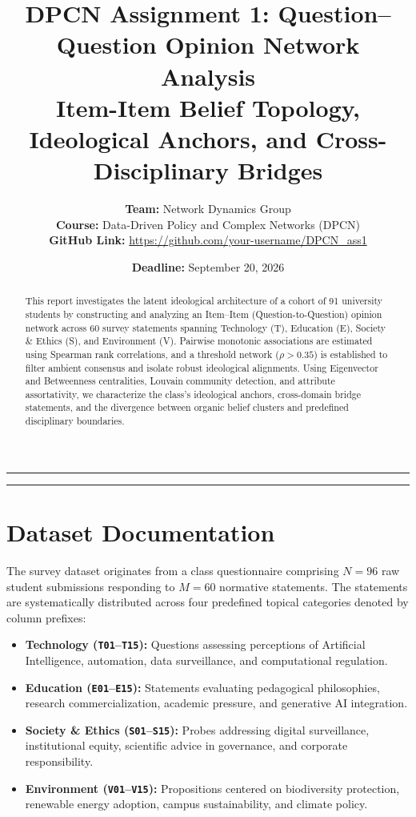\documentclass[11pt,a4paper]{article}
\title{\textbf{DPCN Assignment 1: Question--Question Opinion Network Analysis}\\
\large Item-Item Belief Topology, Ideological Anchors, and Cross-Disciplinary Bridges}
\author{\textbf{Team:} Network Dynamics Group \\
\textbf{Course:} Data-Driven Policy and Complex Networks (DPCN) \\
\textbf{GitHub Link:} \url{https://github.com/your-username/DPCN_ass1}}
\date{\textbf{Deadline:} September 20, 2026}
\begin{document}
\maketitle

\hrule
\vspace{0.5em}

\begin{abstract}
This report investigates the latent ideological architecture of a cohort of 91 university students by constructing and analyzing an Item--Item (Question-to-Question) opinion network across 60 survey statements spanning Technology (T), Education (E), Society \& Ethics (S), and Environment (V). Pairwise monotonic associations are estimated using Spearman rank correlations, and a threshold network ($\rho > 0.35$) is established to filter ambient consensus and isolate robust ideological alignments. Using Eigenvector and Betweenness centralities, Louvain community detection, and attribute assortativity, we characterize the class's ideological anchors, cross-domain bridge statements, and the divergence between organic belief clusters and predefined disciplinary boundaries.
\end{abstract}

\vspace{0.5em}
\hrule
\vspace{1.5em}

\section{Dataset Documentation}
The survey dataset originates from a class questionnaire comprising $N = 96$ raw student submissions responding to $M = 60$ normative statements. The statements are systematically distributed across four predefined topical categories denoted by column prefixes:
\begin{itemize}
    \item \textbf{Technology (\texttt{T01}--\texttt{T15}):} Questions assessing perceptions of Artificial Intelligence, automation, data surveillance, and computational regulation.
    \item \textbf{Education (\texttt{E01}--\texttt{E15}):} Statements evaluating pedagogical philosophies, research commercialization, academic pressure, and generative AI integration.
    \item \textbf{Society \& Ethics (\texttt{S01}--\texttt{S15}):} Probes addressing digital surveillance, institutional equity, scientific advice in governance, and corporate responsibility.
    \item \textbf{Environment (\texttt{V01}--\texttt{V15}):} Propositions centered on biodiversity protection, renewable energy adoption, campus sustainability, and climate policy.
\end{itemize}
\end{document}
